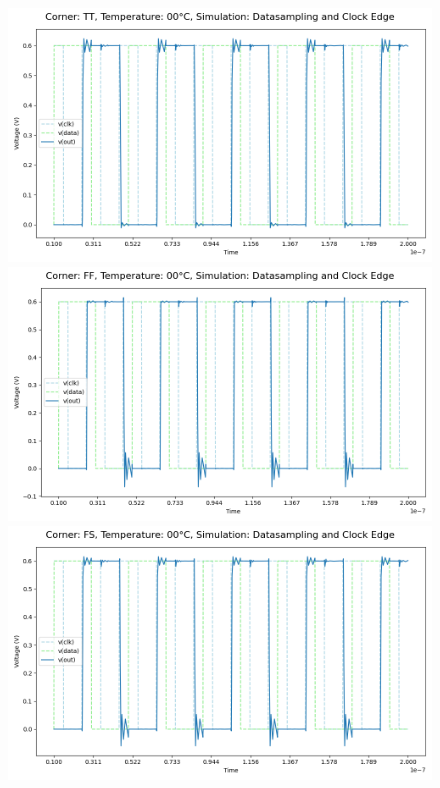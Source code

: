 \begin{figure}[H]
    \centering
    \includegraphics[height= 0.21\textheight]{figures/aimspice/0.600_0.1u_0.1u_0.3u_0.1u/functionality/TT00W1.png}
    \vspace{5pt}
    \includegraphics[height= 0.21\textheight]{figures/aimspice/0.600_0.1u_0.1u_0.3u_0.1u/functionality/FF00W1.png}
    \vspace{5pt}
    \includegraphics[height= 0.21\textheight]{figures/aimspice/0.600_0.1u_0.1u_0.3u_0.1u/functionality/FS00W1.png}

\end{figure}
